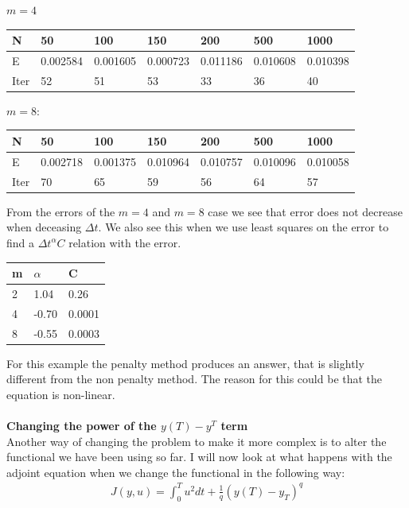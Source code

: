 \documentclass[11pt,a4paper]{article}
\begin{document}
$m=4$
\begin{center}
    \begin{tabular}{| l | l | l | l | l | l | l |}
    \hline
    N & 50 & 100  & 150 & 200 & 500 & 1000 \\ \hline
    E & 0.002584 & 0.001605 &0.000723& 0.011186 & 0.010608 & 0.010398\\ \hline
    Iter & 52 & 51  & 53 & 33 & 36 & 40 \\ \hline
    \end{tabular}
\end{center}
$m=8$:
\begin{center}
    \begin{tabular}{| l | l | l | l | l | l | l |}
    \hline
    N & 50 & 100  & 150 & 200 & 500 & 1000 \\ \hline
    E & 0.002718 & 0.001375 &0.010964 & 0.010757 & 0.010096 & 0.010058	\\ \hline
    Iter & 70 & 65  & 59 & 56 & 64 & 57 \\ \hline
    \end{tabular}
\end{center}
From the errors of the $m=4$ and $m=8$ case we see that error does not decrease when deceasing $\Delta t$. We also see this when we use least squares on the error to find a $\Delta t^{\alpha}C$ relation with the error.
\begin{center}
    \begin{tabular}{| l | l | l |}
    \hline
    m & $\alpha$ & C \\ \hline
    2 & 1.04& 0.26\\ \hline
    4 & -0.70& 0.0001\\ \hline
    8 & -0.55&0.0003 \\ \hline
    \end{tabular}
\end{center}
For this example the penalty method produces an answer, that is slightly different from the non penalty method. The reason for this could be that the equation is non-linear.
\\
\\
\textbf{Changing the power of the $y(T)-y^T$ term}
\\
Another way of changing the problem to make it more complex is to alter the functional we have been using so far. I will now look at what happens with the adjoint equation when we change the functional in the following way:
  \begin{align*}
J(y,u) = \int_0^T u^2 dt + \frac{1}{q}(y(T)-y_T)^q
\end{align*}
\end{document}
